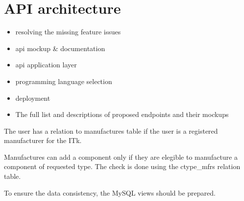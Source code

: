\chapter{API architecture}
\label{chap:apiArchitecture}


\begin{itemize}
	\item resolving the missing feature issues
	\item api mockup \& documentation
	\item api application layer
	\item programming language selection
	\item deployment
	\item The full list and descriptions of proposed endpoints and their mockups
\end{itemize}



\par The user has a relation to manufactures table if the user is a registered manufacturer for the ITk.

\par Manufactures can add a component only if they are elegible to manufacture a component of requested type. The check is done using the ctype\_mfrs relation table.

\par To ensure the data consistency, the MySQL views should be prepared.